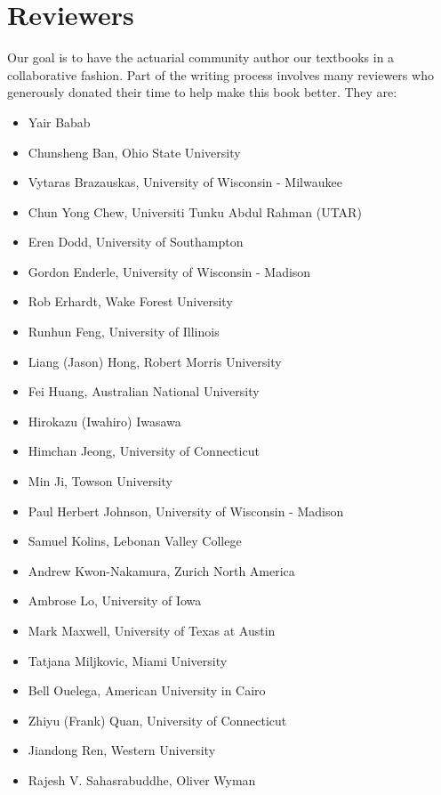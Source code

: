 \documentclass[]{book}
\providecommand{\tightlist}{%
  \setlength{\itemsep}{0pt}\setlength{\parskip}{0pt}}
\begin{document}
\section*{Reviewers}\label{reviewers}

Our goal is to have the actuarial community author our textbooks in a
collaborative fashion. Part of the writing process involves many
reviewers who generously donated their time to help make this book
better. They are:

\begin{itemize}
\tightlist
\item
  Yair Babab
\item
  Chunsheng Ban, Ohio State University
\item
  Vytaras Brazauskas, University of Wisconsin - Milwaukee
\item
  Chun Yong Chew, Universiti Tunku Abdul Rahman (UTAR)
\item
  Eren Dodd, University of Southampton
\item
  Gordon Enderle, University of Wisconsin - Madison
\item
  Rob Erhardt, Wake Forest University
\item
  Runhun Feng, University of Illinois
\item
  Liang (Jason) Hong, Robert Morris University
\item
  Fei Huang, Australian National University
\item
  Hirokazu (Iwahiro) Iwasawa
\item
  Himchan Jeong, University of Connecticut
\item
  Min Ji, Towson University
\item
  Paul Herbert Johnson, University of Wisconsin - Madison
\item
  Samuel Kolins, Lebonan Valley College
\item
  Andrew Kwon-Nakamura, Zurich North America
\item
  Ambrose Lo, University of Iowa
\item
  Mark Maxwell, University of Texas at Austin
\item
  Tatjana Miljkovic, Miami University
\item
  Bell Ouelega, American University in Cairo
\item
  Zhiyu (Frank) Quan, University of Connecticut
\item
  Jiandong Ren, Western University
\item
  Rajesh V. Sahasrabuddhe, Oliver Wyman

\end{itemize}
\end{document}
